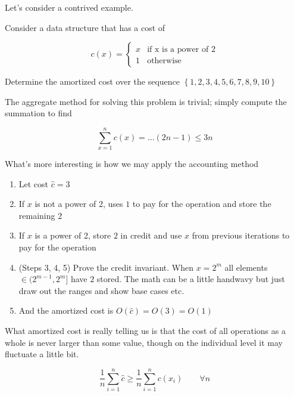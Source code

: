 \documentclass[../notes.tex]{subfiles}
\begin{document}
Let's consider a contrived example.

\begin{example}
	Consider a data structure that has a cost of 


	\begin{equation}
		c(x) = \begin{cases}
			x & \text{if x is a power of 2} \\
			1 & \text{otherwise}
		\end{cases}
	\end{equation}

	Determine the amortized cost over the sequence $ \left\{ 1, 2, 3, 4, 5, 6, 7, 8, 9, 10 \right\} $

	The aggregate method for solving this problem is trivial; simply compute the summation to find

	\begin{equation}
		\sum_{x=1}^{n} c(x) = \ldots (2n-1) \leq 3n
	\end{equation}

	What's more interesting is how we may apply the accounting method

	\begin{enumerate}
		\item Let cost $ \hat{c} = 3 $
		\item If $ x $ is not a power of 2, uses $ 1 $ to pay for the operation and store the remaining $ 2 $
		\item If $ x $ is a power of 2, store $ 2 $ in credit and use $ x $ from previous iterations to pay for the operation
		\item (Steps 3, 4, 5) Prove the credit invariant. When $ x = 2^m $ all elements $ \in (2^{m-1}, 2^{m}] $ have $ 2 $ stored. The math can be a little handwavy but just draw out the ranges and show base cases etc.
		\item And the amortized cost is $ O(\hat{c}) = O(3) = O(1)$
	\end{enumerate}

\end{example}

What amortized cost is really telling us is that the cost of all operations as a whole is never larger than some value, though on the individual level it may fluctuate a little bit.

\begin{equation}
	\frac{1}{n} \sum_{i=1}^{n}  \hat{c} \ge \frac{1}{n} \sum_{i=1}^{n} c(x_i)  \qquad \forall n
\end{equation}
\end{document}
